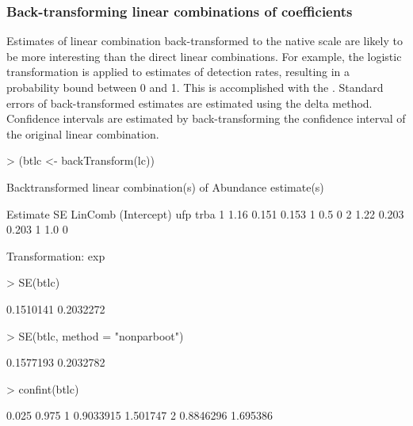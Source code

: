 \documentclass[article,shortnames]{jss}
\begin{document}
\subsubsection{Back-transforming linear combinations of coefficients}

Estimates of linear combination back-transformed to the native scale
are likely to be more interesting than the direct linear combinations.
For example, the logistic transformation is applied to estimates of
detection rates, resulting in a probability bound between 0 and
1. This is accomplished with the .  Standard
errors of back-transformed estimates are estimated using the delta
method.  Confidence intervals are estimated by back-transforming the
confidence interval of the original linear combination.

\begin{Schunk}
\begin{Sinput}
> (btlc <- backTransform(lc))
\end{Sinput}
\begin{Soutput}
Backtransformed linear combination(s) of Abundance estimate(s)

  Estimate    SE LinComb (Intercept) ufp trba
1     1.16 0.151   0.153           1 0.5    0
2     1.22 0.203   0.203           1 1.0    0

Transformation: exp 
\end{Soutput}
\begin{Sinput}
> SE(btlc)
\end{Sinput}
\begin{Soutput}
[1] 0.1510141 0.2032272
\end{Soutput}
\begin{Sinput}
> SE(btlc, method = "nonparboot")
\end{Sinput}
\begin{Soutput}
[1] 0.1577193 0.2032782
\end{Soutput}
\begin{Sinput}
> confint(btlc)
\end{Sinput}
\begin{Soutput}
      0.025    0.975
1 0.9033915 1.501747
2 0.8846296 1.695386
\end{Soutput}
\end{Schunk}

\end{document}
